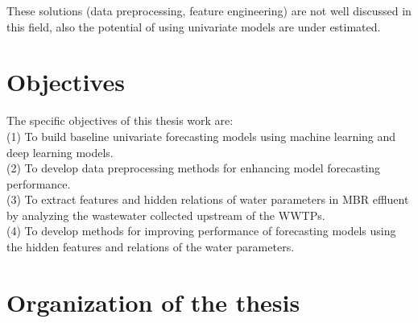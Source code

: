 These solutions (data preprocessing, feature engineering) are not well discussed in this field, also the 
potential of using univariate models are under estimated.



\section{Objectives}
\noindent
The specific objectives of this thesis work are:\\
(1) To build baseline univariate forecasting models using machine learning and deep learning models.\\
(2) To develop data preprocessing methods for enhancing model forecasting performance.\\
(3) To extract features and hidden relations of water parameters in MBR effluent by analyzing the wastewater collected upstream of the WWTPs.\\
(4) To develop methods for improving performance of forecasting models using the hidden features and relations of the water parameters.

\section{Organization of the thesis}